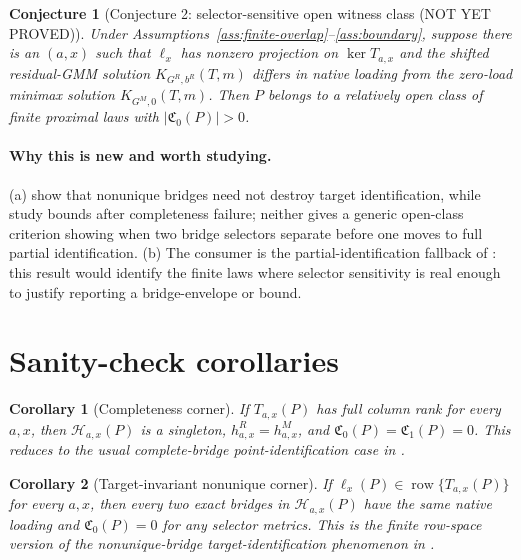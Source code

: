 \documentclass[11pt]{article}
\newcommand{\calH}{\mathcal{H}}
\theoremstyle{definition}
\theoremstyle{plain}
\newtheorem{conjecture}{Conjecture}
\newtheorem{corollary}{Corollary}
\theoremstyle{remark}
\begin{document}
\begin{conjecture}[Conjecture 2: selector-sensitive open witness class (NOT YET PROVED)]\label{conj:witness}
Under Assumptions~\ref{ass:finite-overlap}--\ref{ass:boundary}, suppose there is an \((a,x)\) such that \(\ell_x\) has nonzero projection on \(\ker T_{a,x}\) and the shifted residual-GMM solution \(K_{G^R,b^R}(T,m)\) differs in native loading from the zero-load minimax solution \(K_{G^M,0}(T,m)\). Then \(P\) belongs to a relatively open class of finite proximal laws with \(|\mathfrak C_0(P)|>0\).
\end{conjecture}

\paragraph{Why this is new and worth studying.}
(a) \citet[abstract and Sections 2--3]{ZhangLiMiaoTchetgen2023} show that nonunique bridges need not destroy target identification, while \citet[abstract and Sections 3--4]{GhassamiShpitserTchetgen2023} study bounds after completeness failure; neither gives a generic open-class criterion showing when two bridge selectors separate before one moves to full partial identification. (b) The consumer is the partial-identification fallback of \citet{GhassamiShpitserTchetgen2023}: this result would identify the finite laws where selector sensitivity is real enough to justify reporting a bridge-envelope or bound.

\section{Sanity-check corollaries}
\begin{corollary}[Completeness corner]\label{cor:complete}
If \(T_{a,x}(P)\) has full column rank for every \(a,x\), then \(\calH_{a,x}(P)\) is a singleton, \(h^R_{a,x}=h^M_{a,x}\), and \(\mathfrak C_0(P)=\mathfrak C_1(P)=0\). This reduces to the usual complete-bridge point-identification case in \citet{MiaoGengTchetgen2018}.
\end{corollary}

\begin{corollary}[Target-invariant nonunique corner]\label{cor:target-invariant}
If \(\ell_x(P)\in\operatorname{row}\{T_{a,x}(P)\}\) for every \(a,x\), then every two exact bridges in \(\calH_{a,x}(P)\) have the same native loading and \(\mathfrak C_0(P)=0\) for any selector metrics. This is the finite row-space version of the nonunique-bridge target-identification phenomenon in \citet{ZhangLiMiaoTchetgen2023}.
\end{corollary}
\end{document}
